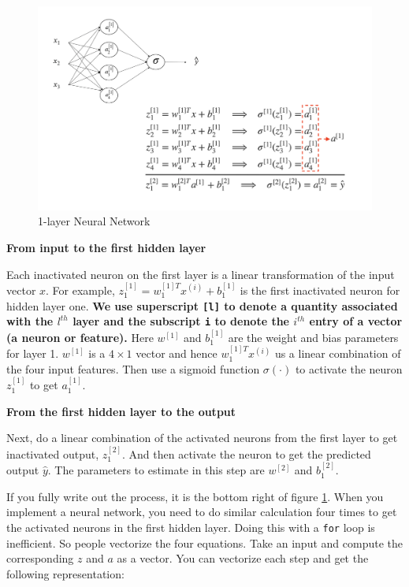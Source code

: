 \documentclass[12pt,]{krantz}
\begin{document}
\begin{figure}

{\centering \includegraphics[width=0.8\linewidth]{images/onelayerNN} 

}

\caption{1-layer Neural Network}\label{fig:onelayernn}
\end{figure}

\textbf{From input to the first hidden layer}

Each inactivated neuron on the first layer is a linear transformation of the input vector \(x\). For example, \(z^{[1]}_1 = w^{[1]T}_1x^{(i)} + b_1^{[1]}\) is the first inactivated neuron for hidden layer one. \textbf{We use superscript \texttt{{[}l{]}} to denote a quantity associated with the \(l^{th}\) layer and the subscript \texttt{i} to denote the \(i^{th}\) entry of a vector (a neuron or feature).} Here \(w^{[1]}\) and \(b_1^{[1]}\) are the weight and bias parameters for layer 1. \(w^{[1]}\) is a \(4 \times 1\) vector and hence \(w^{[1]T}_1x^{(i)}\) us a linear combination of the four input features. Then use a sigmoid function \(\sigma(\cdot)\) to activate the neuron \(z^{[1]}_1\) to get \(a^{[1]}_1\).

\textbf{From the first hidden layer to the output}

Next, do a linear combination of the activated neurons from the first layer to get inactivated output, \(z^{[2]}_1\). And then activate the neuron to get the predicted output \(\hat{y}\). The parameters to estimate in this step are \(w^{[2]}\) and \(b_1^{[2]}\).

If you fully write out the process, it is the bottom right of figure \ref{fig:onelayernn}. When you implement a neural network, you need to do similar calculation four times to get the activated neurons in the first hidden layer. Doing this with a \texttt{for} loop is inefficient. So people vectorize the four equations. Take an input and compute the corresponding \(z\) and \(a\) as a vector. You can vectorize each step and get the following representation:
\end{document}
